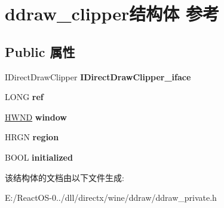 \hypertarget{structddraw__clipper}{}\section{ddraw\+\_\+clipper结构体 参考}
\label{structddraw__clipper}
\subsection*{Public 属性}
\begin{DoxyCompactItemize}
\item 
\mbox{\label{structddraw__clipper_a155af6490c2679e7899eb4ce35bf6dce}} 
I\+Direct\+Draw\+Clipper {\bfseries I\+Direct\+Draw\+Clipper\+\_\+iface}
\item 
\mbox{\label{structddraw__clipper_a0252487b0a2a1d307e2617f1af9d4422}} 
L\+O\+NG {\bfseries ref}
\item 
\mbox{\label{structddraw__clipper_a86801d029c32c0b0402fc94d7a607251}} 
\hyperlink{interfacevoid}{H\+W\+ND} {\bfseries window}
\item 
\mbox{\label{structddraw__clipper_abc21348e2ed53facf765ff55d3c78ac5}} 
H\+R\+GN {\bfseries region}
\item 
\mbox{\label{structddraw__clipper_a99db5ea2d9c1f59751b771276f35f428}} 
B\+O\+OL {\bfseries initialized}
\end{DoxyCompactItemize}


该结构体的文档由以下文件生成\+:\begin{DoxyCompactItemize}
\item 
E\+:/\+React\+O\+S-\/0../dll/directx/wine/ddraw/ddraw\+\_\+private.\+h\end{DoxyCompactItemize}
